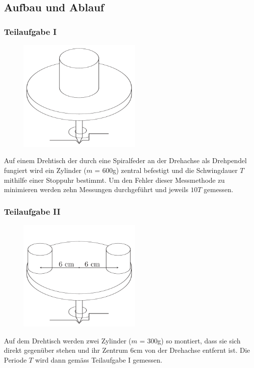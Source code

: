 \documentclass[12pt,a4paper]{article}
\begin{document}
\subsection*{Aufbau und Ablauf}
\subsubsection*{Teilaufgabe I}
\begin{figure}
\vspace{-50pt}
\centering
\includegraphics[width=6cm]{illustration11.pdf}
\end{figure}
Auf einem Drehtisch der durch eine Spiralfeder an der Drehachse als Drehpendel fungiert wird ein Zylinder ($m$ = 600g) zentral befestigt und die Schwingdauer $T$ mithilfe einer Stopp\-uhr bestimmt. Um den Fehler dieser Messmethode zu minimieren werden zehn Messungen durchgef\"uhrt und jeweils $10T$ gemessen.

\subsubsection*{Teilaufgabe II}
\begin{figure}
\vspace{-50pt}
\centering
\includegraphics[width=6cm]{illustration12.pdf}
\end{figure}
Auf dem Drehtisch werden zwei Zylinder ($m$ = 300g) so montiert, dass sie sich direkt gegen\"uber stehen und ihr Zentrum 6cm von der Drehachse entfernt ist. Die Periode $T$ wird dann gem\"ass Teilaufgabe I gemessen.
\end{document}
